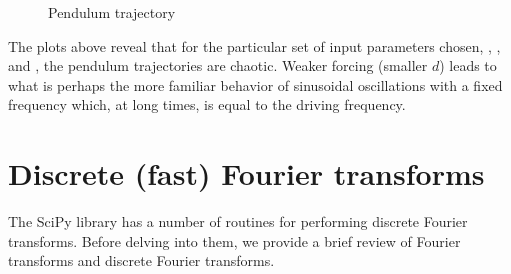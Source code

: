 \documentclass[letterpaper,10pt,english]{sphinxmanual}
\begin{document}
\begin{figure}[htbp]
\centering
\capstart

\caption{Pendulum trajectory}\label{chap9/chap9_scipy:fig-odepend}\end{figure}

The plots above reveal that for the particular set of input parameters chosen, , , and , the pendulum trajectories are chaotic.  Weaker forcing (smaller $d$) leads to what is perhaps the more familiar behavior of sinusoidal oscillations with a fixed frequency which, at long times, is equal to the driving frequency.


\section{Discrete (fast) Fourier transforms}
\label{chap9/chap9_scipy:index-5}\label{chap9/chap9_scipy:discrete-fast-fourier-transforms}
The SciPy library has a number of routines for performing discrete Fourier transforms.  Before delving into them, we provide a brief review of Fourier transforms and discrete Fourier transforms.
\end{document}
